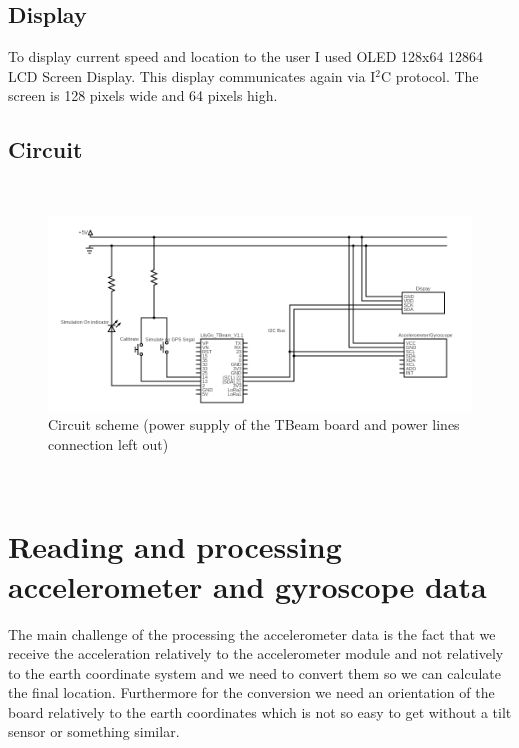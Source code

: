 \documentclass[hidelinks,a4paper]{article}
\begin{document}
\subsection{Display}
To display current speed and location to the user I used OLED 128x64 12864 LCD Screen Display. This display communicates again via I${}^2$C protocol. The screen is 128 pixels wide and 64 pixels high.
\subsection{Circuit}

${}$
\begin{figure}[h]
    \includegraphics[width=15cm]{img/circuit.png}
    \caption{Circuit scheme (power supply of the TBeam board and power lines connection left out)}
\end{figure}
${}$

\section{Reading and processing accelerometer and gyroscope data}
The main challenge of the processing the accelerometer data is the fact that we receive the acceleration relatively to the accelerometer module and not relatively to the earth coordinate system and we need to convert them so we can calculate the final location. Furthermore for the conversion we need an orientation of the board relatively to the earth coordinates which is not so easy to get without a tilt sensor or something similar.
\end{document}
